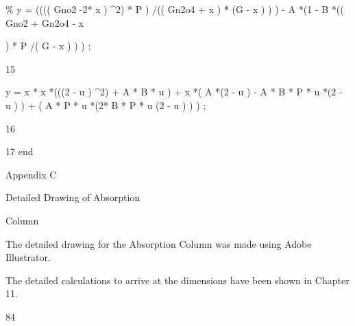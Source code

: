 \documentclass[a4paper,portrait,12pt]{article}
\begin{document}
\begin{flushleft}
\% y = (((( Gno2 -2* x ) \^{}2) * P ) /(( Gn2o4 + x ) * (G - x ) ) ) - A *(1 - B *(( Gno2 + Gn2o4 - x
\end{flushleft}


\begin{flushleft}
) * P /( G - x ) ) ) ;
\end{flushleft}





15





\begin{flushleft}
y = x * x *(((2 - u ) \^{}2) + A * B * u ) + x *( A *(2 - u ) - A * B * P * u *(2 - u ) ) + ( A * P * u *(2* B * P * u (2 - u ) ) ) ;
\end{flushleft}





16


\begin{flushleft}
17 end
\end{flushleft}





\begin{flushleft}
\newpage
Appendix C
\end{flushleft}





\begin{flushleft}
Detailed Drawing of Absorption
\end{flushleft}


\begin{flushleft}
Column
\end{flushleft}


\begin{flushleft}
The detailed drawing for the Absorption Column was made using Adobe Illustrator.
\end{flushleft}


\begin{flushleft}
The detailed calculations to arrive at the dimensions have been shown in Chapter 11.
\end{flushleft}





84
\end{document}
